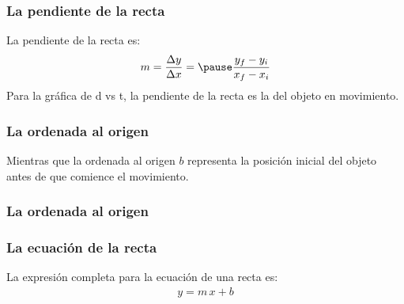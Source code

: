 \documentclass[14pt]{beamer}
\begin{document}
\begin{frame}
\frametitle{La pendiente de la recta}
La pendiente de la recta es:
\pause
\begin{eqnarray*}
\begin{aligned}
m = \dfrac{\Delta y}{\Delta x} = \pause \dfrac{y_{f} - y_{i}}{x_{f} - x_{i}}
\end{aligned}
\end{eqnarray*}
Para la gráfica de d vs t, la pendiente de la recta es la  del objeto en movimiento.
\end{frame}
\begin{frame}
\frametitle{La ordenada al origen}
Mientras que la ordenada al origen $b$ representa la posición inicial del objeto antes de que comience el movimiento.
\end{frame}
\begin{frame}
\frametitle{La ordenada al origen}
\vspace{-1cm}
\begin{figure}
    \centering
\end{figure}
\end{frame}
\begin{frame}
\frametitle{La ecuación de la recta}
La expresión completa para la ecuación de una recta es:
\pause
\begin{align*}
y = m \, x + b
\end{align*}
\end{frame}
\end{document}
